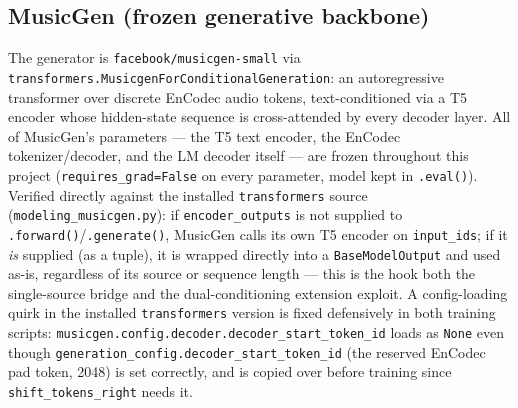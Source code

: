 \documentclass[11pt]{article}
\begin{document}
\subsection{MusicGen (frozen generative backbone)}
The generator is \texttt{facebook/musicgen-small} via
\texttt{transformers.MusicgenForConditionalGeneration}: an autoregressive transformer over
discrete EnCodec audio tokens, text-conditioned via a T5 encoder whose hidden-state sequence is
cross-attended by every decoder layer. All of MusicGen's parameters --- the T5 text encoder, the
EnCodec tokenizer/decoder, and the LM decoder itself --- are frozen throughout this project
(\texttt{requires\_grad=False} on every parameter, model kept in \texttt{.eval()}). Verified
directly against the installed \texttt{transformers} source
(\texttt{modeling\_musicgen.py}): if \texttt{encoder\_outputs} is not supplied to
\texttt{.forward()}/\texttt{.generate()}, MusicGen calls its own T5 encoder on \texttt{input\_ids};
if it \emph{is} supplied (as a tuple), it is wrapped directly into a \texttt{BaseModelOutput} and
used as-is, regardless of its source or sequence length --- this is the hook both the single-source
bridge and the dual-conditioning extension exploit. A config-loading quirk in the installed
\texttt{transformers} version is fixed defensively in both training scripts:
\texttt{musicgen.config.decoder.decoder\_start\_token\_id} loads as \texttt{None} even though
\texttt{generation\_config.decoder\_start\_token\_id} (the reserved EnCodec pad token, 2048) is set
correctly, and is copied over before training since \texttt{shift\_tokens\_right} needs it.
\end{document}
